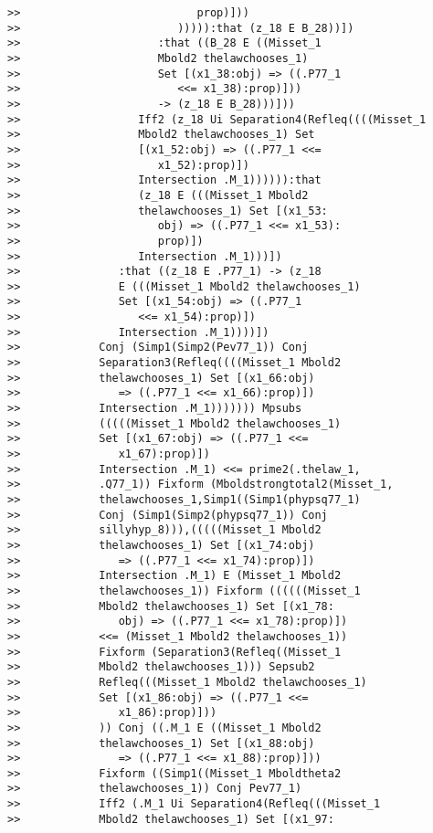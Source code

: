 \documentclass[12pt]{article}
\begin{document}
\begin{verbatim}
>>                           prop)]))
>>                        ))))):that (z_18 E B_28))])
>>                     :that ((B_28 E ((Misset_1
>>                     Mbold2 thelawchooses_1)
>>                     Set [(x1_38:obj) => ((.P77_1
>>                        <<= x1_38):prop)]))
>>                     -> (z_18 E B_28)))]))
>>                  Iff2 (z_18 Ui Separation4(Refleq((((Misset_1
>>                  Mbold2 thelawchooses_1) Set
>>                  [(x1_52:obj) => ((.P77_1 <<=
>>                     x1_52):prop)])
>>                  Intersection .M_1)))))):that
>>                  (z_18 E (((Misset_1 Mbold2
>>                  thelawchooses_1) Set [(x1_53:
>>                     obj) => ((.P77_1 <<= x1_53):
>>                     prop)])
>>                  Intersection .M_1)))])
>>               :that ((z_18 E .P77_1) -> (z_18
>>               E (((Misset_1 Mbold2 thelawchooses_1)
>>               Set [(x1_54:obj) => ((.P77_1
>>                  <<= x1_54):prop)])
>>               Intersection .M_1))))])
>>            Conj (Simp1(Simp2(Pev77_1)) Conj
>>            Separation3(Refleq((((Misset_1 Mbold2
>>            thelawchooses_1) Set [(x1_66:obj)
>>               => ((.P77_1 <<= x1_66):prop)])
>>            Intersection .M_1))))))) Mpsubs
>>            (((((Misset_1 Mbold2 thelawchooses_1)
>>            Set [(x1_67:obj) => ((.P77_1 <<=
>>               x1_67):prop)])
>>            Intersection .M_1) <<= prime2(.thelaw_1,
>>            .Q77_1)) Fixform (Mboldstrongtotal2(Misset_1,
>>            thelawchooses_1,Simp1((Simp1(phypsq77_1)
>>            Conj (Simp1(Simp2(phypsq77_1)) Conj
>>            sillyhyp_8))),(((((Misset_1 Mbold2
>>            thelawchooses_1) Set [(x1_74:obj)
>>               => ((.P77_1 <<= x1_74):prop)])
>>            Intersection .M_1) E (Misset_1 Mbold2
>>            thelawchooses_1)) Fixform ((((((Misset_1
>>            Mbold2 thelawchooses_1) Set [(x1_78:
>>               obj) => ((.P77_1 <<= x1_78):prop)])
>>            <<= (Misset_1 Mbold2 thelawchooses_1))
>>            Fixform (Separation3(Refleq((Misset_1
>>            Mbold2 thelawchooses_1))) Sepsub2
>>            Refleq(((Misset_1 Mbold2 thelawchooses_1)
>>            Set [(x1_86:obj) => ((.P77_1 <<=
>>               x1_86):prop)]))
>>            )) Conj ((.M_1 E ((Misset_1 Mbold2
>>            thelawchooses_1) Set [(x1_88:obj)
>>               => ((.P77_1 <<= x1_88):prop)]))
>>            Fixform ((Simp1((Misset_1 Mboldtheta2
>>            thelawchooses_1)) Conj Pev77_1)
>>            Iff2 (.M_1 Ui Separation4(Refleq(((Misset_1
>>            Mbold2 thelawchooses_1) Set [(x1_97:

\end{verbatim}
\end{document}
